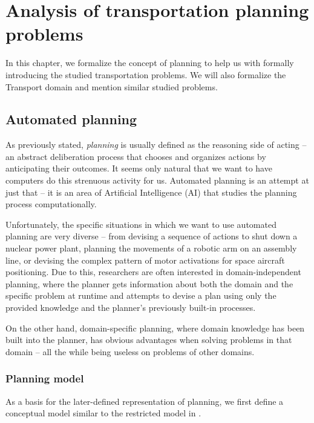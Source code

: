 \chapter{Analysis of transportation planning problems}

In this chapter, we formalize the concept of planning to help us with formally introducing the studied transportation problems. We will also formalize the Transport domain and mention similar studied problems.

\section{Automated planning}

As previously stated, \textit{planning} is usually defined as the reasoning side of acting -- an abstract deliberation
process that chooses and organizes actions by anticipating their outcomes. \citep[Section~1.1]{Ghallab2004}
It seems only natural that we want to have computers do this strenuous activity for us.
Automated planning is an attempt at just that -- it is an area of Artificial Intelligence (AI) that
studies the planning process computationally. \citep[Section~1.1]{Ghallab2004}

Unfortunately, the specific situations in which we want to use automated planning are very diverse --
from devising a sequence of actions to shut down a nuclear power plant,
planning the movements of a robotic arm
on an assembly line, or devising the complex pattern of motor activations
for space aircraft positioning.
Due to this, researchers are often interested in domain-independent planning,
where the planner gets information
about both the domain and the specific problem at runtime and attempts to devise a plan using only the provided knowledge
and the planner's previously built-in processes. \citep[Section~1.3]{Ghallab2004}

On the other hand, domain-specific planning, where domain knowledge has been built into the planner,
has obvious advantages when solving problems in that domain -- all the while being useless on problems of other
domains. \citep[Section~1.3]{Ghallab2004}

\subsection{Planning model}

As a basis for the later-defined representation of planning, we first define
a conceptual model similar to the restricted model in \citep[Section~1.4, Section~1.5]{Ghallab2004}.

